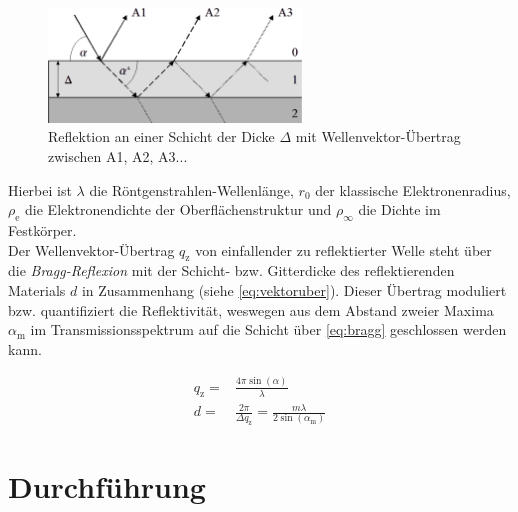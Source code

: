 \documentclass[numbers=noenddot,a4paper,notitlepage,twoside,BCOR15mm]{scrartcl}
\newcommand{\ix}[1]{_\text{#1}}
\newcommand{\tilt}[1]{\textit{#1}}
\begin{document}
				\begin{figure}[H]
					\centering
					\includegraphics[width=0.6\textwidth]{rontgenreflekt.png}
					\caption{Reflektion an einer Schicht der Dicke $\Delta$ mit Wellenvektor-Übertrag zwischen A1, A2, A3... \cite{USiegenMIE}}
				\end{figure}

			Hierbei ist $\lambda$ die Röntgenstrahlen-Wellenlänge, $r\ix{0}$ der klassische Elektronenradius, $\rho\ix{e}$ die Elektronendichte der Oberflächenstruktur und $\rho\ix{$\infty$}$ die Dichte im Festkörper.\\
			Der Wellenvektor-Übertrag $q\ix{z}$ von einfallender zu reflektierter Welle steht über die \tilt{Bragg-Reflexion} mit der Schicht- bzw. Gitterdicke des reflektierenden Materials $d$ in Zusammenhang (siehe \autoref{eq:vektoruber}). Dieser Übertrag moduliert bzw. quantifiziert die Reflektivität, weswegen aus dem Abstand zweier Maxima $\alpha\ix{m}$ im Transmissionsspektrum auf die Schicht über \autoref{eq:bragg} geschlossen werden kann.

				\begin{align}
					q\ix{z}=&\frac{4\pi\sin\left(\alpha\right)}{\lambda} \label{eq:vektoruber} \\
					d=&\frac{2\pi}{\Delta q\ix{z}}=\frac{m\lambda}{2\sin\left(\alpha\ix{m}\right)} \label{eq:bragg}
				\end{align}

	\newpage
	\section{Durchführung}
\end{document}
